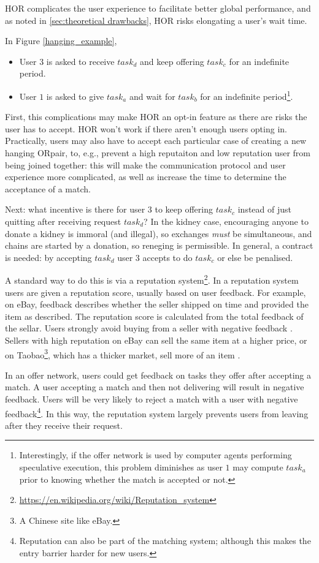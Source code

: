 \documentclass[main.tex]{subfiles}
\begin{document}
HOR complicates the user experience to facilitate better global performance, and as noted in \ref{sec:theoretical drawbacks}, HOR risks elongating a user's wait time.

In Figure \ref{hanging_example},
\begin{itemize}
  \item User $3$ is asked to receive $task_d$ and keep offering $task_c$ for an indefinite period.
  \item User $1$ is asked to give $task_a$ and wait for $task_b$ for an indefinite period\footnote{Interestingly, if the offer network is used by computer agents performing speculative execution, this problem diminishes as user $1$ may compute $task_a$ prior to knowing whether the match is accepted or not.}.
\end{itemize}

First, this complications may make HOR an opt-in feature as there are risks the user has to accept. HOR won't work if there aren't enough users opting in. Practically, users may also have to accept each particular case of creating a new hanging ORpair, to, e.g., prevent a high reputaiton and low reputation user from being joined together: this will make the communication protocol and user experience more complicated, as well as increase the time to determine the acceptance of a match.

Next: what incentive is there for user $3$ to keep offering $task_c$ instead of just quitting after receiving request $task_d$? In the kidney case, encouraging anyone to donate a kidney is immoral (and illegal), so exchanges \textit{must} be simultaneous, and chains are started by a donation, so reneging is permissible. In general, a contract is needed: by accepting $task_d$ user $3$ accepts to do $task_c$ or else be penalised.

A standard way to do this is via a reputation system\footnote{\url{https://en.wikipedia.org/wiki/Reputation_system}}. In a reputation system users are given a reputation score, usually based on user feedback. For example, on eBay, feedback describes whether the seller shipped on time and provided the item as described. The reputation score is calculated from the total feedback of the sellar. Users strongly avoid buying from a seller with negative feedback \cite{ebay}. Sellers with high reputation on eBay can sell the same item at a higher price, or on Taobao\footnote{A Chinese site like eBay.}, which has a thicker market, sell more of an item \cite{Ye1}.

In an offer network, users could get feedback on tasks they offer after accepting a match. A user accepting a match and then not delivering will result in negative feedback. Users will be very likely to reject a match with a user with negative feedback\footnote{Reputation can also be part of the matching system; although this makes the entry barrier harder for new users.}. In this way, the reputation system largely prevents users from leaving after they receive their request.
\end{document}
